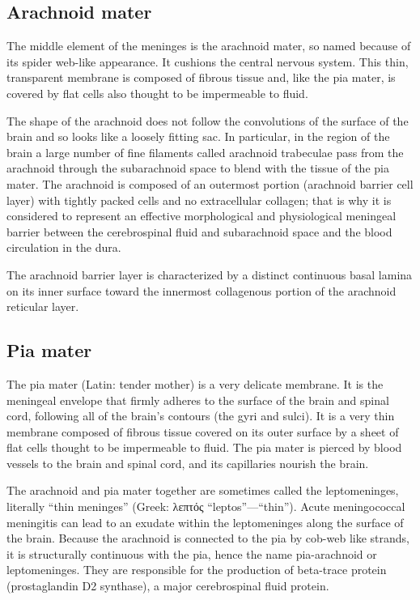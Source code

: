 \documentclass[]{book}
\begin{document}
\hypertarget{arachnoid-mater}{%
\subsection{Arachnoid mater}\label{arachnoid-mater}}

The middle element of the meninges is the arachnoid mater, so named because of its spider web-like appearance. It cushions the central nervous system. This thin, transparent membrane is composed of fibrous tissue and, like the pia mater, is covered by flat cells also thought to be impermeable to fluid.

The shape of the arachnoid does not follow the convolutions of the surface of the brain and so looks like a loosely fitting sac. In particular, in the region of the brain a large number of fine filaments called arachnoid trabeculae pass from the arachnoid through the subarachnoid space to blend with the tissue of the pia mater. The arachnoid is composed of an outermost portion (arachnoid barrier cell layer) with tightly packed cells and no extracellular collagen; that is why it is considered to represent an effective morphological and physiological meningeal barrier between the cerebrospinal fluid and subarachnoid space and the blood circulation in the dura.

The arachnoid barrier layer is characterized by a distinct continuous basal lamina on its inner surface toward the innermost collagenous portion of the arachnoid reticular layer.

\hypertarget{pia-mater}{%
\subsection{Pia mater}\label{pia-mater}}

The pia mater (Latin: tender mother) is a very delicate membrane. It is the meningeal envelope that firmly adheres to the surface of the brain and spinal cord, following all of the brain's contours (the gyri and sulci). It is a very thin membrane composed of fibrous tissue covered on its outer surface by a sheet of flat cells thought to be impermeable to fluid. The pia mater is pierced by blood vessels to the brain and spinal cord, and its capillaries nourish the brain.

The arachnoid and pia mater together are sometimes called the leptomeninges, literally ``thin meninges'' (Greek: λεπτός ``leptos''---``thin''). Acute meningococcal meningitis can lead to an exudate within the leptomeninges along the surface of the brain. Because the arachnoid is connected to the pia by cob-web like strands, it is structurally continuous with the pia, hence the name pia-arachnoid or leptomeninges. They are responsible for the production of beta-trace protein (prostaglandin D2 synthase), a major cerebrospinal fluid protein.
\end{document}
